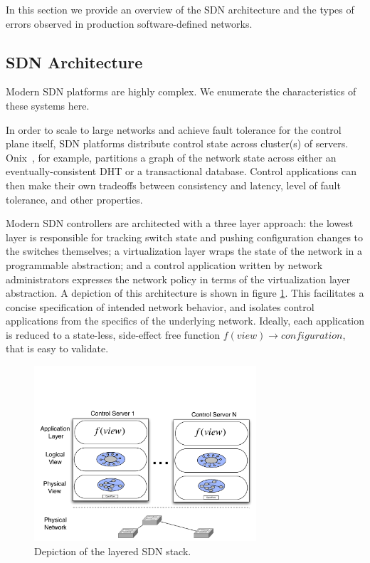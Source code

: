 In this section we provide an overview of the SDN architecture and the types
of errors observed in production software-defined networks.

\subsection{SDN Architecture}

Modern SDN platforms are highly complex. We enumerate the characteristics of
these systems here.

In order to scale to large networks and achieve fault tolerance for the control
plane itself, SDN platforms distribute control state across cluster(s) of servers.
Onix~\cite{onix}, for example,
partitions a graph of the network state across either an eventually-consistent
DHT or a transactional database. Control applications can then make their own
tradeoffs between consistency and latency, level of fault tolerance, and other
properties.

Modern SDN controllers are architected with a three layer approach: the lowest
layer is responsible for tracking switch state and pushing configuration
changes to the switches themselves; a virtualization layer
wraps the state of the network in a programmable abstraction; and a control
application written by network administrators 
expresses the network policy in terms of the virtualization layer abstraction.
A depiction of this architecture is shown in figure \ref{fig:basicarch}.
This facilitates a concise specification of
intended network behavior, and isolates control applications from the specifics
of the underlying network. Ideally, each application is reduced to a
state-less, side-effect free function $f(view) \rightarrow configuration$, that is
easy to validate. 

\begin{figure}[t]
    \includegraphics[width=3.25in]{../diagrams/architecture/SDN_stack.pdf}
    \caption[]{\label{fig:basicarch} Depiction of the layered SDN stack.} 
\end{figure}

